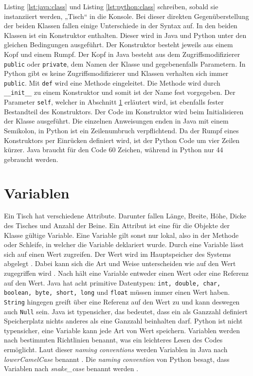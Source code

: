 Listing \ref{lst:java:class} und Listing \ref{lst:python:class} schreiben, sobald sie instanziiert werden, „Tisch“ in die Konsole. Bei dieser direkten Gegenüberstellung der beiden Klassen fallen einige Unterschiede in der Syntax auf. In den beiden Klassen ist ein Konstruktor enthalten. Dieser wird in Java und Python unter den gleichen Bedingungen ausgeführt. Der Konstruktor besteht jeweils aus einem Kopf und einem Rumpf. Der Kopf in Java besteht aus dem Zugriffsmodifizierer \texttt{public} oder \texttt{private}, dem Namen der Klasse und gegebenenfalls Parametern. In Python gibt es keine Zugriffsmodifizierer und Klassen verhalten sich immer \texttt{public}. Mit \texttt{def} wird eine Methode eingeleitet. Die Methode wird durch \texttt{\_\_init\_\_} zu einem Konstruktor und somit ist der Name fest vorgegeben. Der Parameter \texttt{self}, welcher in Abschnitt \ref{wsuwmv} erläutert wird, ist ebenfalls fester Bestandteil des Konstruktors. Der Code im Konstruktor wird beim Initialisieren der Klasse ausgeführt. Die einzelnen Anweisungen enden in Java mit einem Semikolon, in Python ist ein Zeilenumbruch verpflichtend. Da der Rumpf eines Konstruktors per Einrücken definiert wird, ist der Python Code um vier Zeilen kürzer. Java braucht für den Code 60 Zeichen, während in Python nur 44 gebraucht werden. 
\par

\section{Variablen}\label{wsuwmv}
Ein Tisch hat verschiedene Attribute. Darunter fallen Länge, Breite, Höhe, Dicke des Tisches und Anzahl der Beine. Ein Attribut ist eine für die Objekte der Klasse gültige Variable. Eine Variable gilt sonst nur lokal, also in der Methode oder Schleife, in welcher die Variable deklariert wurde. Durch eine Variable lässt sich auf einen Wert zugreifen. Der Wert wird im Hauptspeicher des Systems abgelegt \cite{Louis:2010}. Dabei kann sich die Art und Weise unterscheiden wie auf den Wert zugegriffen wird \cite{JVMS}. Nach \cite{JVMS} hält eine Variable entweder einen Wert oder eine Referenz auf den Wert. Java hat acht primitive Datentypen: \texttt{int, double, char, boolean, byte, short, long} und \texttt{float} müssen immer einen Wert haben. \texttt{String} hingegen greift über eine Referenz auf den Wert zu und kann deswegen auch \texttt{Null} sein. Java ist typensicher, das bedeutet, dass ein als Ganzzahl definiert Speicherplatz nichts anderes als eine Ganzzahl beinhalten darf. Python ist nicht typensicher, eine Variable kann jede Art von Wert speichern. Variablen werden nach bestimmten Richtlinien benannt, was ein leichteres Lesen des Codes ermöglicht. Laut dieser \textit{naming conventions} werden Variablen in Java nach \textit{lowerCamelCase} benannt \cite{Microsoft:CapCon}. Die \textit{naming convention} von Python besagt, dass Variablen nach \textit{snake\_case} benannt werden \cite{Ims:h-s}\cite{JavaNC}\cite{PythonStyle}. 

